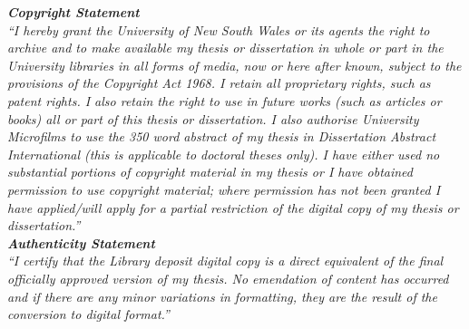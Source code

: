 \begin{center}
\begin{minipage}{0.6\textwidth}
\bigskip
\bigskip
\bigskip
\bigskip
\bigskip
\bigskip
  \textit{
    \textbf{Copyright Statement}\\
    \smallskip
``I hereby grant the University of New South Wales or its agents the right to archive and to make available my thesis or dissertation in whole or part in the University libraries in all forms of media, now or here after known, subject to the provisions of the Copyright Act 1968. I retain all proprietary rights, such as patent rights. I also retain the right to use in future works (such as articles or books) all or part of this thesis or dissertation.
I also authorise University Microfilms to use the 350 word abstract of my thesis in Dissertation Abstract International (this is applicable to doctoral theses only).
I have either used no substantial portions of copyright material in my thesis or I have obtained permission to use copyright material; where permission has not been granted I have applied/will apply for a partial restriction of the digital copy of my thesis or dissertation.''
  }\\
\bigskip
\bigskip
  \textit{
    \textbf{Authenticity Statement}\\
    \smallskip
    ``I certify that the Library deposit digital copy is a direct equivalent of the final officially approved version of my thesis. No emendation of content has occurred and if there are any minor variations in formatting, they are the result of the conversion to digital format.''
  }
\end{minipage}
\end{center}
